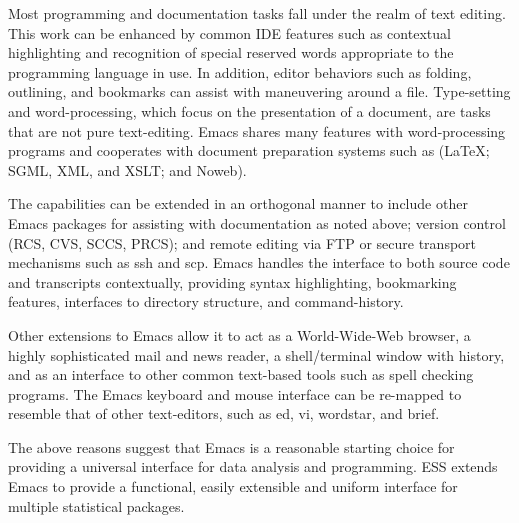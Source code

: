 \documentclass{article}
\newcommand*{\XLispStat}{\textsc{XLispStat}}
\newcommand{\stexttt}[1]{{\small\texttt{#1}}}
\newcommand{\file}[1]{`\stexttt{#1}'}
\begin{document}
Most programming and documentation tasks fall under the realm of text
editing.  This work can be enhanced by common IDE features such as
contextual highlighting and recognition of special reserved words
appropriate to the programming language in use.  In addition, editor
behaviors such as folding, outlining, and bookmarks can assist with
maneuvering around a file.  Type-setting and word-processing, which
focus on the presentation of a document, are tasks that are not pure
text-editing.  Emacs shares many features with word-processing
programs and cooperates with document preparation systems such as
(\LaTeX; SGML, XML, and XSLT; and Noweb).

The capabilities can be extended in an orthogonal manner to include
other Emacs packages for assisting with documentation as noted above;
version control (RCS, CVS, SCCS, PRCS); and remote editing via FTP or
secure transport mechanisms such as ssh and scp.  Emacs handles the
interface to both source code and transcripts contextually, providing
syntax highlighting, bookmarking features, interfaces to directory
structure, and command-history.


Other extensions to Emacs allow it to act as a World-Wide-Web browser,
a highly sophisticated mail and news reader, a shell/terminal window
with history, and as an interface to other common text-based tools
such as spell checking programs.  The Emacs keyboard and mouse
interface can be re-mapped to resemble that of other text-editors,
such as ed, vi, wordstar, and brief.

The above reasons suggest that Emacs is a reasonable starting choice
for providing a universal interface for data analysis and programming.
ESS extends Emacs to provide a functional, easily extensible and
uniform interface for multiple statistical packages.
\end{document}

